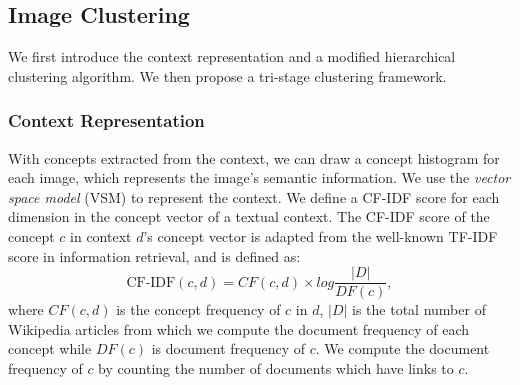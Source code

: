 




\subsection{Image Clustering}
We first introduce the context representation and a modified
hierarchical clustering algorithm. We then propose
a tri-stage clustering framework.

\subsubsection{Context Representation}
With concepts extracted from the context, we can draw a
concept histogram for each image, which represents the image's semantic
information. We use the \emph{vector space model} (VSM) to represent the
context. We define a CF-IDF score
for each dimension in the concept vector of a textual context. The
CF-IDF score of the concept $c$ in context $d$'s concept vector
is adapted from the well-known TF-IDF score in information retrieval,
and is defined as:
\begin{equation}
\label{cfidf}
\mbox{CF-IDF}(c, d)= CF(c, d) \times log\frac{|D|}{DF(c)},
\end{equation}
where $CF(c,d)$ is the concept frequency of $c$ in $d$, $|D|$ is the
total number of Wikipedia articles from which we compute the document frequency
of each concept %
while $DF(c)$ is document frequency of $c$. We compute the document
frequency of $c$ by counting the number of documents which have links
to $c$.

